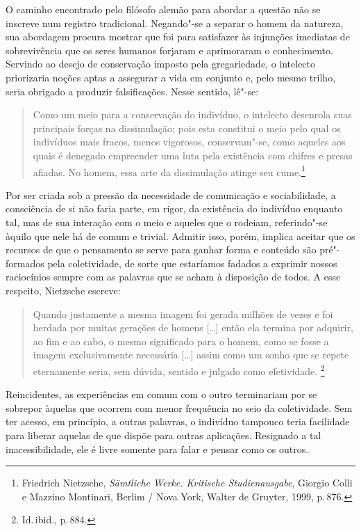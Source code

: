 O caminho encontrado pelo filósofo alemão para abordar a questão
não se inscreve num registro tradicional.
Negando"-se a
separar o homem da natureza, sua abordagem procura mostrar que foi para
satisfazer às injunções imediatas de sobrevivência que os seres humanos
forjaram e aprimoraram o conhecimento. Servindo ao desejo de
conservação imposto pela gregariedade, o intelecto priorizaria noções
aptas a assegurar a vida em conjunto e, pelo mesmo trilho, 
seria obrigado a produzir falsificações. Nesse sentido, 
lê"-se: 

\begin{quote}
Como um meio para a
conservação do indivíduo, o intelecto desenrola suas principais forças
na dissimulação; pois esta constitui o meio pelo qual os indivíduos
mais fracos, menos vigorosos, conservam"-se, como aqueles aos quais é
denegado empreender uma luta pela existência com chifres e presas
afiadas. No homem, essa arte da dissimulação atinge seu
cume.\footnote{ Friedrich Nietzsche, \textit{Sämtliche Werke.
Kritische Studienausgabe}, Giorgio Colli e Mazzino Montinari,
Berlim / Nova York, Walter de Gruyter, 1999, p.\,876.}
\end{quote}

Por ser criada sob a pressão da necessidade de comunicação e sociabilidade, a
consciência de si não faria parte, em rigor, da existência do indivíduo
enquanto tal, mas de sua interação com o meio e aqueles que o rodeiam,
referindo"-se àquilo que nele há de comum e trivial. Admitir isso, porém,
implica aceitar que os recursos de que o pensamento se serve para
ganhar forma e conteúdo são pré"-formados pela coletividade, de sorte
que estaríamos fadados a exprimir nossos raciocínios sempre com as
palavras que se acham à disposição de todos. A esse respeito, Nietzsche
escreve: 

\begin{quote}
Quando justamente a mesma imagem foi gerada milhões de vezes
e foi herdada por muitas gerações de homens [\ldots{}] então ela termina por
adquirir, ao fim e ao cabo, o mesmo significado para o homem, como se
fosse a imagem exclusivamente necessária [\dots] assim como um sonho que
se repete eternamente seria, sem dúvida, sentido e julgado como
efetividade. \footnote{ Id.\,ibid., p.\,884.} 
\end{quote}

Reincidentes,
as experiências em comum com o outro terminariam por se sobrepor
àquelas que ocorrem com menor frequência no seio da coletividade. Sem
ter acesso, em princípio, a outras palavras, o indivíduo tampouco
teria facilidade para liberar aquelas de que dispõe para outras
aplicações. Resignado a tal inacessibilidade, ele é livre somente
para falar e pensar como os outros.

